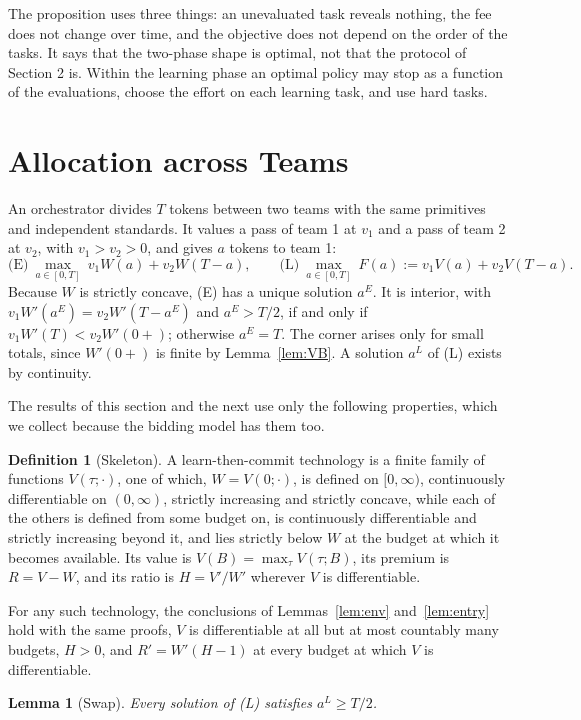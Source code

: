 \documentclass[11pt]{article}
\newtheorem{lemma}{Lemma}
\theoremstyle{definition}
\newtheorem{definition}{Definition}
\begin{document}
The proposition uses three things: an unevaluated task reveals nothing, the fee does not change over time, and the objective does not depend on the order of the tasks. It says that the two-phase shape is optimal, not that the protocol of Section 2 is. Within the learning phase an optimal policy may stop as a function of the evaluations, choose the effort on each learning task, and use hard tasks.

\section{Allocation across Teams}

An orchestrator divides $T$ tokens between two teams with the same primitives and independent standards. It values a pass of team 1 at $v_1$ and a pass of team 2 at $v_2$, with $v_1>v_2>0$, and gives $a$ tokens to team 1:
\[
\text{(E)}\ \max_{a\in[0,T]}\ v_1W(a)+v_2W(T-a),
\qquad
\text{(L)}\ \max_{a\in[0,T]}\ F(a):=v_1V(a)+v_2V(T-a).
\]
Because $W$ is strictly concave, (E) has a unique solution $a^E$. It is interior, with $v_1W'(a^E)=v_2W'(T-a^E)$ and $a^E>T/2$, if and only if $v_1W'(T)<v_2W'(0+)$; otherwise $a^E=T$. The corner arises only for small totals, since $W'(0+)$ is finite by Lemma~\ref{lem:VB}. A solution $a^L$ of (L) exists by continuity.

The results of this section and the next use only the following properties, which we collect because the bidding model has them too.

\begin{definition}[Skeleton]\label{def:skeleton}
A learn-then-commit technology is a finite family of functions $V(\tau;\cdot)$, one of which, $W=V(0;\cdot)$, is defined on $[0,\infty)$, continuously differentiable on $(0,\infty)$, strictly increasing and strictly concave, while each of the others is defined from some budget on, is continuously differentiable and strictly increasing beyond it, and lies strictly below $W$ at the budget at which it becomes available. Its value is $V(B)=\max_\tau V(\tau;B)$, its premium is $R=V-W$, and its ratio is $H=V'/W'$ wherever $V$ is differentiable.
\end{definition}

For any such technology, the conclusions of Lemmas~\ref{lem:env} and~\ref{lem:entry} hold with the same proofs, $V$ is differentiable at all but at most countably many budgets, $H>0$, and $R'=W'(H-1)$ at every budget at which $V$ is differentiable.

\begin{lemma}[Swap]\label{lem:swap}
Every solution of (L) satisfies $a^L\ge T/2$.
\end{lemma}
\end{document}
